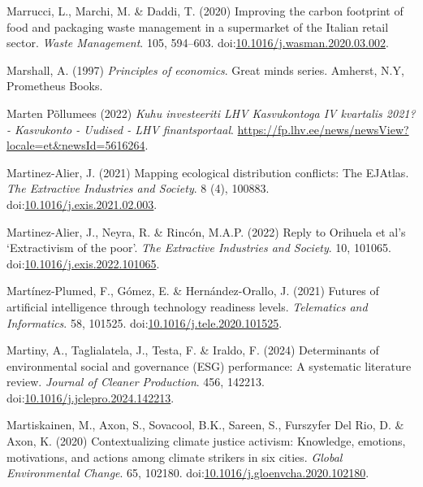 \documentclass[
  letterpaper,
  DIV=11,
  numbers=noendperiod]{scrartcl}
\newlength{\cslhangindent}
\newenvironment{CSLReferences}[2] %
 {\begin{list}{}{%
  \setlength{\itemindent}{0pt}
  \setlength{\leftmargin}{0pt}
  \setlength{\parsep}{0pt}
  \ifodd #1
   \setlength{\leftmargin}{\cslhangindent}
   \setlength{\itemindent}{-1\cslhangindent}
  \fi
  \setlength{\itemsep}{#2\baselineskip}}}
 {\end{list}}
\begin{document}
\begin{CSLReferences}{0}{1}
Marrucci, L., Marchi, M. \& Daddi, T. (2020) Improving the carbon
footprint of food and packaging waste management in a supermarket of the
{Italian} retail sector. \emph{Waste Management}. 105, 594--603.
doi:\href{https://doi.org/10.1016/j.wasman.2020.03.002}{10.1016/j.wasman.2020.03.002}.

Marshall, A. (1997) \emph{Principles of economics}. Great minds series.
Amherst, N.Y, Prometheus Books.

Marten Põllumees (2022) \emph{Kuhu investeeriti {LHV Kasvukontoga IV}
kvartalis 2021? - {Kasvukonto} - {Uudised} - {LHV} finantsportaal}.
\url{https://fp.lhv.ee/news/newsView?locale=et&newsId=5616264}.

Martinez-Alier, J. (2021) Mapping ecological distribution conflicts:
{The EJAtlas}. \emph{The Extractive Industries and Society}. 8 (4),
100883.
doi:\href{https://doi.org/10.1016/j.exis.2021.02.003}{10.1016/j.exis.2021.02.003}.

Martinez-Alier, J., Neyra, R. \& Rincón, M.A.P. (2022) Reply to
{Orihuela} et al's {`{Extractivism} of the poor'}. \emph{The Extractive
Industries and Society}. 10, 101065.
doi:\href{https://doi.org/10.1016/j.exis.2022.101065}{10.1016/j.exis.2022.101065}.

Martínez-Plumed, F., Gómez, E. \& Hernández-Orallo, J. (2021) Futures of
artificial intelligence through technology readiness levels.
\emph{Telematics and Informatics}. 58, 101525.
doi:\href{https://doi.org/10.1016/j.tele.2020.101525}{10.1016/j.tele.2020.101525}.

Martiny, A., Taglialatela, J., Testa, F. \& Iraldo, F. (2024)
Determinants of environmental social and governance ({ESG}) performance:
{A} systematic literature review. \emph{Journal of Cleaner Production}.
456, 142213.
doi:\href{https://doi.org/10.1016/j.jclepro.2024.142213}{10.1016/j.jclepro.2024.142213}.

Martiskainen, M., Axon, S., Sovacool, B.K., Sareen, S., Furszyfer Del
Rio, D. \& Axon, K. (2020) Contextualizing climate justice activism:
{Knowledge}, emotions, motivations, and actions among climate strikers
in six cities. \emph{Global Environmental Change}. 65, 102180.
doi:\href{https://doi.org/10.1016/j.gloenvcha.2020.102180}{10.1016/j.gloenvcha.2020.102180}.


\end{CSLReferences}
\end{document}
